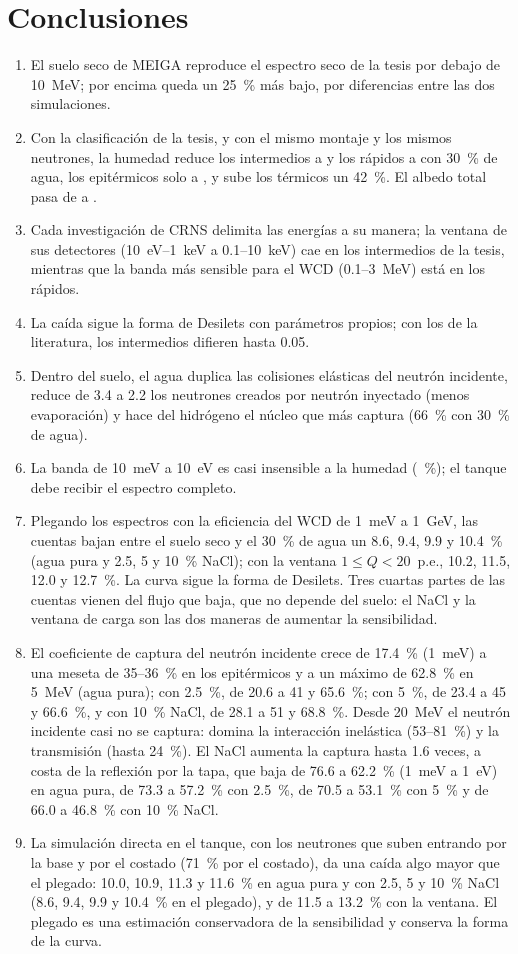 \documentclass[11pt,a4paper]{article}
\begin{document}
\section{Conclusiones}
\begin{enumerate}
\item El suelo seco de MEIGA reproduce el espectro seco de la tesis por debajo de 10~MeV; por encima queda un 25~\% más
bajo, por diferencias entre las dos simulaciones.
\item Con la clasificación de la tesis, y con el mismo montaje y los mismos neutrones, la humedad reduce los
intermedios a \IntTreinta{} y los rápidos a \RapTreinta{} con 30~\% de agua, los epitérmicos solo a \EpiTreinta, y
sube los térmicos un 42~\%. El albedo total pasa de \albSeco{} a \albTreinta.
\item Cada investigación de CRNS delimita las energías a su manera; la ventana de sus detectores (10~eV--1~keV a
0.1--10~keV) cae en los intermedios de la tesis, mientras que la banda más sensible para el WCD (0.1--3~MeV) está en
los rápidos.
\item La caída sigue la forma de Desilets con parámetros propios; con los de la literatura, los intermedios difieren
hasta 0.05.
\item Dentro del suelo, el agua duplica las colisiones elásticas del neutrón incidente, reduce de 3.4 a 2.2 los
neutrones creados por neutrón inyectado (menos evaporación) y hace del hidrógeno el núcleo que más captura (66~\% con
30~\% de agua).
\item La banda de 10~meV a 10~eV es casi insensible a la humedad (\bandaMax~\%); el tanque debe recibir el espectro
completo.
\item Plegando los espectros con la eficiencia del WCD de 1~meV a 1~GeV, las cuentas bajan entre el suelo seco y el
30~\% de agua un 8.6, 9.4, 9.9 y 10.4~\% (agua pura y 2.5, 5 y 10~\% NaCl); con la ventana $1\leq Q<20$~p.e., 10.2,
11.5, 12.0 y 12.7~\%. La curva
sigue la forma de Desilets. Tres cuartas partes de las cuentas vienen del flujo que baja, que no depende del suelo: el
NaCl y la ventana de carga son las dos maneras de aumentar la sensibilidad.
\item El coeficiente de captura del neutrón incidente crece de 17.4~\% (1~meV) a una meseta de 35--36~\% en los
epitérmicos y a un máximo de 62.8~\% en 5~MeV (agua pura); con 2.5~\%, de 20.6 a 41 y 65.6~\%; con 5~\%, de 23.4
a 45 y 66.6~\%, y con 10~\% NaCl, de 28.1 a 51 y 68.8~\%. Desde 20~MeV el
neutrón incidente casi no se captura: domina la interacción inelástica (53--81~\%) y la transmisión (hasta 24~\%). El NaCl aumenta la captura hasta 1.6 veces, a costa de la
reflexión por la tapa, que baja de 76.6 a 62.2~\% (1~meV a 1~eV) en agua pura, de 73.3 a 57.2~\% con 2.5~\%, de
70.5 a 53.1~\% con 5~\% y de 66.0 a 46.8~\% con 10~\% NaCl.
\item La simulación directa en el tanque, con los neutrones que suben entrando por la base y por el costado (71~\% por
el costado), da una caída algo mayor que el plegado: 10.0, 10.9, 11.3 y 11.6~\% en agua pura y con 2.5, 5 y 10~\% NaCl (8.6,
9.4, 9.9 y 10.4~\% en el plegado), y de 11.5 a 13.2~\% con la ventana. El plegado es una estimación conservadora de la sensibilidad y conserva
la forma de la curva.
\end{enumerate}
\end{document}
